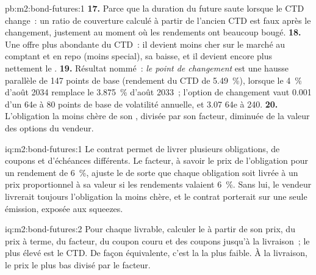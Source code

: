 \begin{solution}{pb:m2:bond-futures:1}
\textbf{17.} Parce que la duration du future saute lorsque le CTD change~: un ratio de
couverture calculé à partir de l'ancien CTD est faux après le changement, justement au moment où les rendements
ont beaucoup bougé.
\textbf{18.} Une offre plus abondante du CTD~: il devient moins cher sur le marché au comptant et en repo
(moins special), sa  baisse, et il devient encore plus nettement le
.
\textbf{19.} Résultat nommé~: \emph{le point de changement} est une hausse parallèle de 147
points de base (rendement du CTD de 5.49~\%), lorsque le 4~\% d'août 2034 remplace le
3.875~\% d'août 2033~; l'option de changement vaut 0.001 d'un 64e à 80 points
de base de volatilité annuelle, et 3.07 64e à 240.
\textbf{20.} L'obligation la moins chère de son , divisée par son facteur, diminuée de la
valeur des options du vendeur.
\end{solution}

\begin{solution}{iq:m2:bond-futures:1}
Le contrat permet de livrer plusieurs obligations, de coupons et d'échéances
différents. Le facteur, à savoir le prix de l'obligation pour un rendement de 6~\%, ajuste
le  de sorte que chaque obligation soit livrée à un prix proportionnel à sa
valeur si les rendements valaient 6~\%. Sans lui, le vendeur livrerait toujours l'obligation
la moins chère, et le contrat porterait sur une seule émission, exposée aux squeezes.
\end{solution}

\begin{solution}{iq:m2:bond-futures:2}
Pour chaque livrable, calculer le  à partir de son prix, du prix à terme,
du facteur, du coupon couru et des coupons jusqu'à la livraison~; le plus élevé est
le CTD. De façon équivalente, c'est la  la plus faible. À la livraison, le prix le plus bas
divisé par le facteur.
\end{solution}

